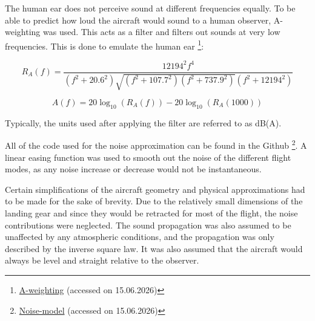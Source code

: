 The human ear does not perceive sound at different frequencies equally. To be able to predict how loud the aircraft would sound to a human observer, A-weighting was used. This acts as a filter and filters out sounds at very low frequencies. This is done to emulate the human ear \footnote{\href{https://en.wikipedia.
org / w / index . php ? title = A - weighting & oldid = 1351161945}{A-weighting} (accessed on 15.06.2026)}: 

\begin{equation}
    R_A(f) = \frac{12194^2 f^4}{\left(f^2 + 20.6^2\right) \sqrt{\left(f^2 + 107.7^2\right)\left(f^2 + 737.9^2\right)} \left(f^2 + 12194^2\right)}
\end{equation}

\begin{equation}
    A(f) = 20\log_{10}\left(R_A(f)\right) - 20\log_{10}\left(R_A(1000)\right)
\end{equation}

Typically, the units used after applying the filter are referred to as dB(A). 

All of the code used for the noise approximation can be found in the Github \footnote{\href{https://github.com/Teo-Cokonaj/DSE-28/blob/0a4e0bae481a25c633ee9a7bbda87498b3a964de/Noise/NoiseModelling.py}{Noise-model} (accessed on 15.06.2026)}. A linear easing function was used to smooth out the noise of the different flight modes, as any noise increase or decrease would not be instantaneous. 

Certain simplifications of the aircraft geometry and physical approximations had to be made for the sake of brevity. Due to the relatively small dimensions of the landing gear and since they would be retracted for most of the flight, the noise contributions were neglected. The sound propagation was also assumed to be unaffected by any atmospheric conditions, and the propagation was only described by the inverse square law. It was also assumed that the aircraft would always be level and straight relative to the observer.  


